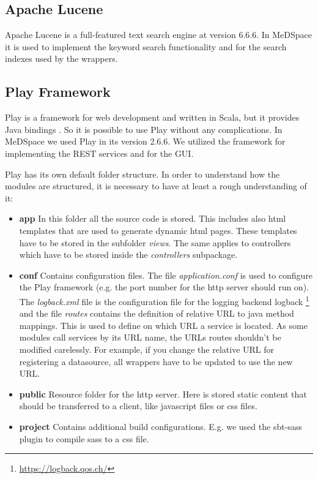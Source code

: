 \subsection{Apache Lucene}

Apache Lucene is a full-featured text search engine \cite{LuceneCore} at version 6.6.6. In MeDSpace it is used to implement the keyword search functionality and for the search indexes used by the wrappers.

\subsection{Play Framework}

Play is a framework for web development and written in Scala, but it provides Java bindings \cite{Play}. So it is possible to use Play without any complications. In MeDSpace we used Play in its version 2.6.6. We utilized the framework for implementing the REST services and for the GUI. 

Play has its own default folder structure. In order to understand how the modules are structured, it is necessary to have at least a rough understanding of it:

\begin{itemize}
\item \textbf{app} In this folder all the source code is stored. This includes also html templates that are used to generate dynamic html pages. These templates have to be stored in the subfolder  \emph{views}. The same applies to controllers which have to be stored inside the \emph{controllers} subpackage.

\item \textbf{conf} Contains configuration files. The  file \emph{application.conf} is used to configure the Play framework (e.g. the port number for the http server should run on). The \emph{logback.xml} file is the configuration file for the logging backend logback \footnote{\url{https://logback.qos.ch/}} and the file \emph{routes} contains the definition of relative URL to java method mappings. This is used to define on which URL a service is located. As some modules call services by its URL name, the URLs routes shouldn't be modified carelessly. For example, if you change the relative URL for registering a datasource, all wrappers have to be updated to use the new URL.

\item \textbf{public} Resource folder for the http server. Here is stored static content that should be transferred to a client, like javascript files or css files.

\item \textbf{project} Contains additional build configurations. E.g. we used the sbt-sass plugin to compile sass to a css file. 
\end{itemize} 

